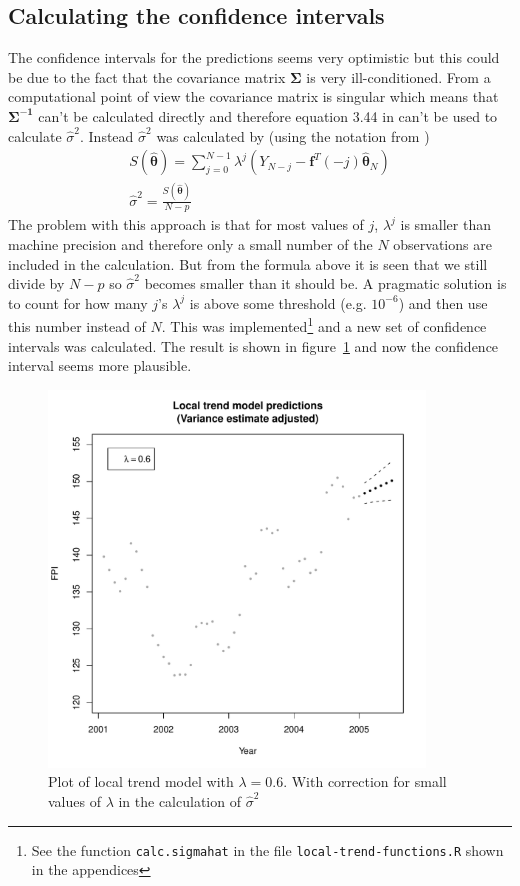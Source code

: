 \documentclass[11pt]{article}
\newcommand\myverb[1]{{\footnotesize\texttt{#1}}}
\begin{document}
\subsection*{Calculating the confidence intervals}
The confidence intervals for the predictions seems very optimistic but this could be due to the fact that the covariance matrix $\mathbf{\Sigma}$ is very ill-conditioned. From a computational point of view the covariance matrix is singular which means that $\mathbf{\Sigma^{-1}}$ can't be calculated directly and therefore equation 3.44 in \cite{hm} can't be used to calculate $\widehat{\sigma}^2$. Instead $\widehat{\sigma}^2$ was calculated by (using the notation from \cite{hm})
\begin{gather*}
    S(\widehat{\boldsymbol{\theta}}) = \sum_{j=0}^{N-1} \lambda^j(Y_{N-j} - \boldsymbol{f}^T(-j)\widehat{\boldsymbol{\theta}}_N) \\
    \widehat{\sigma}^2 = \frac{S(\widehat{\boldsymbol{\theta}})}{N-p}
\end{gather*}
The problem with this approach is that for most values of $j$, $\lambda^j$ is smaller than machine precision and therefore only a small number of the $N$ observations are included in the calculation. But from the formula above it is seen that we still divide by $N-p$ so $\widehat{\sigma}^2$ becomes smaller than it should be. A pragmatic solution is to count for how many $j$'s $\lambda^j$ is above some threshold (e.g. $10^{-6}$) and then use this number instead of $N$. This was implemented\footnote{See the function \myverb{calc.sigmahat} in the file \myverb{local-trend-functions.R} shown in the appendices} and a new set of confidence intervals was calculated. The result is shown in figure~\ref{fig:local-trend-model-adjusted} and now the confidence interval seems more plausible.

\begin{figure}
    \centering
    \includegraphics[width=100mm]{local-trend-predict-adjusted-6.pdf}
    \caption{Plot of local trend model with $\lambda=0.6$. With correction for small values of $\lambda$ in the calculation of $\widehat{\sigma}^2$}
    \label{fig:local-trend-model-adjusted}
\end{figure}
\end{document}
